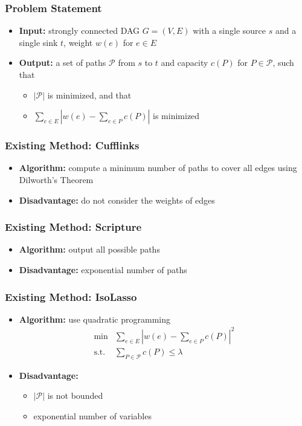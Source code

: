 \frame
{
	\frametitle{Problem Statement}

	\begin{itemize}
	\item {\bf Input:} strongly connected DAG $G=(V,E)$ with a single source $s$ and a single sink $t$,
		weight $w(e)$ for $e\in E$

	\vspace{0.2cm}

	\item {\bf Output:} a set of paths $\mathcal{P}$ from $s$ to $t$ and capacity $c(P)$ for $P\in\mathcal{P}$, such that
		\begin{itemize}
		\item $|\mathcal{P}|$ is minimized, and that
		\item $\sum_{e\in E} | w(e) - \sum_{e\in P} c(P)|$ is minimized
		\end{itemize}
	\end{itemize}

	\vspace{1.0cm}
	
	\vspace{1.0cm}
}

\frame
{
	\frametitle{Existing Method: Cufflinks}

	\begin{itemize}
	\item {\bf Algorithm:} compute a minimum number of paths to cover all edges using Dilworth's Theorem
	\vspace{0.5cm}
	\item {\bf Disadvantage:} do not consider the weights of edges
	\end{itemize}
}

\frame
{
	\frametitle{Existing Method: Scripture}
	\begin{itemize}
	\item {\bf Algorithm:} output all possible paths
	\vspace{0.5cm}
	\item {\bf Disadvantage:} exponential number of paths
	\end{itemize}
}


\frame
{
	\frametitle{Existing Method: IsoLasso}
	\begin{itemize}
	\item {\bf Algorithm:} use quadratic programming
		\begin{displaymath}
		\begin{array}{rl}
		\min & \sum_{e\in E} | w(e) - \sum_{e\in P} c(P)|^2 \\
		\textrm{s.t.} & \sum_{P\in\mathcal{P}} c(P) \le \lambda
		\end{array}
		\end{displaymath}

	\vspace{0.2cm}
	\item {\bf Disadvantage:} 
		\begin{itemize}
		\item $|\mathcal{P}|$ is not bounded
		\item exponential number of variables
		\end{itemize}

	\end{itemize}
}


